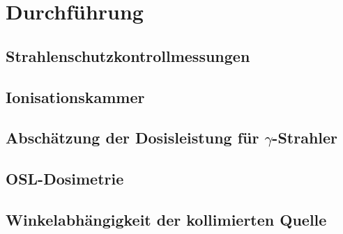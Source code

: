 \section{Durchführung}
\subsection{Strahlenschutzkontrollmessungen}

\subsection{Ionisationskammer}

\subsection{Abschätzung der Dosisleistung für $\gamma$-Strahler}

\subsection{OSL-Dosimetrie}

\subsection{Winkelabhängigkeit der kollimierten Quelle}